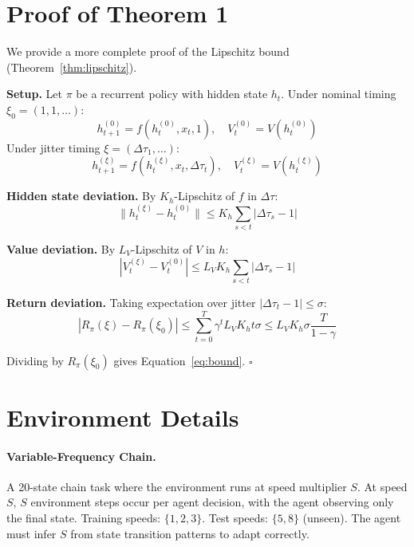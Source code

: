 \documentclass[10pt,twocolumn]{article}
\newcommand{\deltatau}{\Delta\tau}
\theoremstyle{plain}
\theoremstyle{definition}
\begin{document}



\appendix

\section{Proof of Theorem 1}
\label{app:proof}

We provide a more complete proof of the Lipschitz bound (Theorem~\ref{thm:lipschitz}).

\textbf{Setup.} Let $\pi$ be a recurrent policy with hidden state $h_t$.
Under nominal timing $\xi_0 = (1,1,\ldots)$:
\begin{equation}
  h_{t+1}^{(0)} = f(h_t^{(0)}, x_t, 1), \quad
  V_{t}^{(0)} = V(h_t^{(0)})
\end{equation}
Under jitter timing $\xi = (\deltatau_1, \ldots)$:
\begin{equation}
  h_{t+1}^{(\xi)} = f(h_t^{(\xi)}, x_t, \deltatau_t), \quad
  V_{t}^{(\xi)} = V(h_t^{(\xi)})
\end{equation}

\textbf{Hidden state deviation.} By $K_h$-Lipschitz of $f$ in $\deltatau$:
\begin{equation}
  \|h_t^{(\xi)} - h_t^{(0)}\| \leq K_h \sum_{s < t} |\deltatau_s - 1|
\end{equation}

\textbf{Value deviation.} By $L_V$-Lipschitz of $V$ in $h$:
\begin{equation}
  |V_t^{(\xi)} - V_t^{(0)}| \leq L_V K_h \sum_{s < t} |\deltatau_s - 1|
\end{equation}

\textbf{Return deviation.} Taking expectation over jitter $|\deltatau_t - 1| \leq \sigma$:
\begin{equation}
  |R_\pi(\xi) - R_\pi(\xi_0)| \leq \sum_{t=0}^T \gamma^t L_V K_h t \sigma
  \leq L_V K_h \sigma \frac{T}{1-\gamma}
\end{equation}

Dividing by $R_\pi(\xi_0)$ gives Equation~\ref{eq:bound}. $\square$

\section{Environment Details}
\label{app:envs}

\paragraph{Variable-Frequency Chain.}
A 20-state chain task where the environment runs at speed multiplier $S$.
At speed $S$, $S$ environment steps occur per agent decision, with the agent
observing only the final state. Training speeds: $\{1, 2, 3\}$.
Test speeds: $\{5, 8\}$ (unseen). The agent must infer $S$ from state transition
patterns to adapt correctly.
\end{document}
